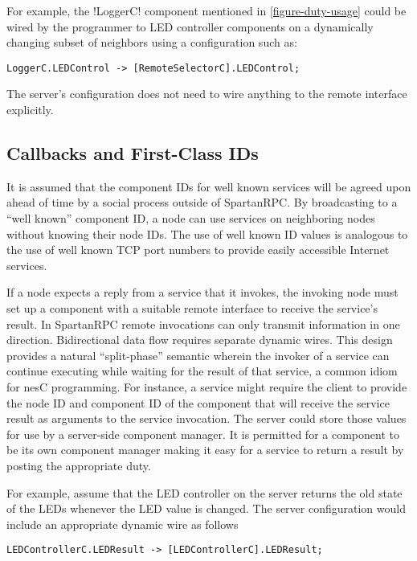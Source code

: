 For example, the !LoggerC! component mentioned in \autoref{figure-duty-usage} could be wired by
the programmer to LED controller components on a dynamically changing subset of neighbors using
a configuration such as:
\begin{lstlisting}
LoggerC.LEDControl -> [RemoteSelectorC].LEDControl;
\end{lstlisting}

The server's configuration does not need to wire anything to the remote interface explicitly.

\subsection{Callbacks and First-Class IDs}

It is assumed that the component IDs for well known services will be agreed upon ahead of time
by a social process outside of SpartanRPC. By broadcasting to a ``well known'' component ID, a
node can use services on neighboring nodes without knowing their node IDs. The use of well known
ID values is analogous to the use of well known TCP port numbers to provide easily accessible
Internet services.

If a node expects a reply from a service that it invokes, the invoking node must set up a
component with a suitable remote interface to receive the service's result. In SpartanRPC remote
invocations can only transmit information in one direction. Bidirectional data flow requires
separate dynamic wires. This design provides a natural ``split-phase'' semantic wherein the
invoker of a service can continue executing while waiting for the result of that service, a
common idiom for nesC programming. For instance, a service might require the client to provide
the node ID and component ID of the component that will receive the service result as arguments
to the service invocation. The server could store those values for use by a server-side
component manager. It is permitted for a component to be its own component manager making it
easy for a service to return a result by posting the appropriate duty.

For example, assume that the LED controller on the server returns the old state of the LEDs
whenever the LED value is changed. The server configuration would include an appropriate
dynamic wire as follows
\begin{lstlisting}
LEDControllerC.LEDResult -> [LEDControllerC].LEDResult;
\end{lstlisting}

